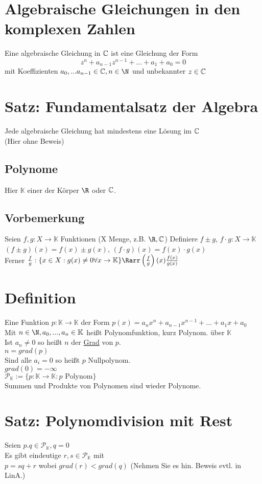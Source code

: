 \section*{Algebraische Gleichungen in den komplexen Zahlen}
Eine algebraische Gleichung in $\text{$\mathbb{C}$}$ ist eine Gleichung der Form 
$$z^n + a_{n-1}z^{n-1} + ... + a_1 + a_0 = 0$$
mit Koeffizienten $a_0, ... a_{n-1} \in \C, n\in \N$ und unbekannter $z\in \text{$\mathbb{C}$}$
\section{Satz: Fundamentalsatz der Algebra}
Jede algebraische Gleichung hat mindestens eine Lösung im $\text{$\mathbb{C}$}$\\
(Hier ohne Beweis)
\subsection*{Polynome}
Hier $\mathbb{K}$ einer der Körper $\R$ oder $\text{$\mathbb{C}$}$.
\subsection*{Vorbemerkung}
Seien $f, g: X \to \mathbb{K}$ Funktionen (X Menge, z.B. $\R, \C$)
Definiere $f±g$, $f\cdot g: X \to \mathbb{K}$\\
$(f±g)(x) = f(x) ± g(x)$, $(f\cdot g)(x)= f(x) \cdot g(x)$\\
Ferner $\frac{f}{g}:\{x\in X: g(x) \neq 0 \forall x \to \mathbb{K}\} \Rarr\left(\frac{f}{g}\right)(x) \frac{f(x)}{g(x)}$
\section*{Definition}
Eine Funktion $p:\mathbb{K} \to \mathbb{K}$ der Form $p(x) = a_nx^n + a_{n-1}x^{n-1} + ... + a_1x + a_0$\\
Mit $n\in \N, a_0, ..., a_n \in \mathbb{K}$ heißt Polynomfunktion, kurz Polynom. über $\mathbb{K}$\\
Ist $a_n \neq 0$ so heißt $n$ der \ul{Grad} von $p$.\\
$n = grad(p)$\\
Sind alle $a_i = 0$ so heißt $p$ Nullpolynom.\\
$grad(0) = -∞$\\
$\mathcal{P}_{\mathbb{K}} := \{p:\mathbb{K} \to \mathbb{K}: p \text{ Polynom}\}$\\
Summen und Produkte von Polynomen sind wieder Polynome.\\
\section{Satz: Polynomdivision mit Rest}
Seien $p. q \in \mathcal{P}_{\mathbb{K}}, q = 0$\\
Es gibt eindeutige $r, s \in \mathcal{P}_{\mathbb{K}}$ mit\\
$p = sq + r$ wobei $grad(r) < grad(q)$
(Nehmen Sie es hin. Beweis evtl. in LinA.)
